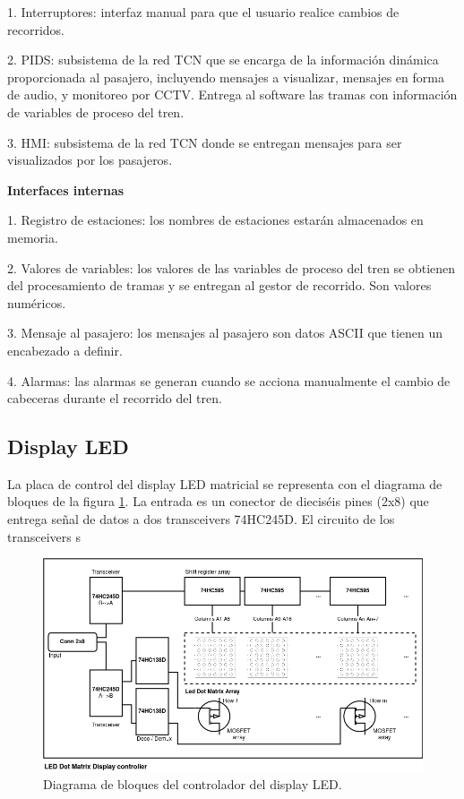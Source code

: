 \documentclass[
11pt, %
]{charter}
\begin{document}
1. Interruptores: interfaz manual para que el usuario realice cambios de recorridos.

2. PIDS: subsistema de la red TCN que se encarga de la información dinámica proporcionada al pasajero, incluyendo mensajes a visualizar, mensajes en forma de audio, y monitoreo por CCTV. Entrega al software las tramas con información de variables de proceso del tren.

3. HMI: subsistema de la red TCN donde se entregan mensajes para ser visualizados por
los pasajeros.

\textbf{Interfaces internas}

1. Registro de estaciones: los nombres de estaciones estarán almacenados en memoria.

2. Valores de variables: los valores de las variables de proceso del tren se obtienen del procesamiento de tramas y se entregan al gestor de recorrido. Son valores numéricos.

3. Mensaje al pasajero: los mensajes al pasajero son datos ASCII que tienen un encabezado a definir.

4. Alarmas: las alarmas se generan cuando se acciona manualmente el cambio de cabeceras durante el recorrido del tren.

\subsection{Display LED}
La placa de control del display LED matricial se representa con el diagrama de bloques de la figura \ref{fig:blockDiagram LED display}. La entrada es un conector de dieciséis pines (2x8) que entrega señal de datos a dos transceivers 74HC245D. El circuito de los transceivers s

\begin{figure}[htpb]
\centering 
\includegraphics[width=1\textwidth]{./Pics/blockDiagram.png}
\caption{Diagrama de bloques del controlador del display LED.}
\label{fig:blockDiagram LED display}
\end{figure}
\end{document}
